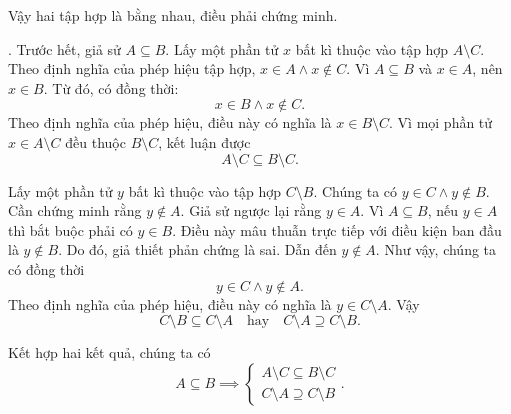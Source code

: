 Vậy hai tập hợp là bằng nhau, điều phải chứng minh.

. Trước hết, giả sử $A \subseteq B$. Lấy một phần tử $x$ bất kì thuộc vào tập hợp $A \setminus C$. Theo định nghĩa của phép hiệu tập hợp,
$ x \in A \land x \notin C. $
Vì $A \subseteq B$ và $x \in A$, nên
$ x \in B. $
Từ đó, có đồng thời:
\[ x \in B \land x \notin C. \]
Theo định nghĩa của phép hiệu, điều này có nghĩa là $ x \in B \setminus C $. Vì mọi phần tử $x \in A \setminus C$ đều thuộc $B \setminus C$, kết luận được
\[ A \setminus C \subseteq B \setminus C. \]

Lấy một phần tử $y$ bất kì thuộc vào tập hợp $C \setminus B$. Chúng ta có $ y \in C \land y \notin B $. Cần chứng minh rằng $y \notin A$. Giả sử ngược lại rằng $y \in A$. Vì $A \subseteq B$, nếu $y \in A$ thì bắt buộc phải có $y \in B$. Điều này mâu thuẫn trực tiếp với điều kiện ban đầu là $y \notin B$.
Do đó, giả thiết phản chứng là sai. Dẫn đến $ y \notin A $. Như vậy, chúng ta có đồng thời
\[ y \in C \land y \notin A. \]
Theo định nghĩa của phép hiệu, điều này có nghĩa là $ y \in C \setminus A $. Vậy
\[ C \setminus B \subseteq C \setminus A \quad \text{hay} \quad C \setminus A \supseteq C \setminus B. \]

Kết hợp hai kết quả, chúng ta có 
\begin{equation}
   A \subseteq B \implies \begin{cases}
      A \setminus C \subseteq B \setminus C \\
      C \setminus A \supseteq C \setminus B
   \end{cases}.
   \label{eq:li_thuyet_tap_hop:tien_de:tien_de_tach:so_sanh_hieu.1}
\end{equation}

